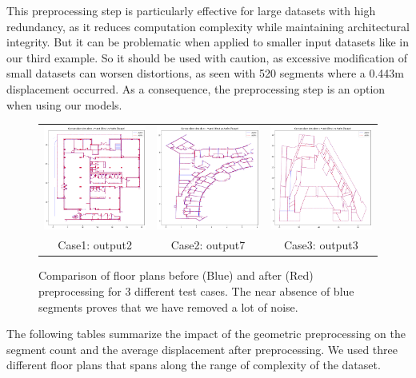 \documentclass[11pt]{article}
\begin{document}
This preprocessing step is particularly effective for large datasets with high 
redundancy, as it reduces computation complexity while maintaining architectural 
integrity. But it can be problematic when applied to smaller input datasets like 
in our third example. So it should be used with caution, as excessive modification 
of small datasets can worsen distortions, as seen with 520 segments where a 0.443m 
displacement occurred. As a consequence, the preprocessing step is an option when
using our models.

\begin{figure}[h]
    \centering
    \begin{tabular}{ccc}
        \includegraphics[width=0.32\linewidth]{figures/avant_apres_pretraitement2.png}
        &
        \includegraphics[width=0.32\linewidth]{figures/avant_apres_pretraitement7.png}
        &
        \includegraphics[width=0.32\linewidth]{figures/avant_apres_pretraitement3.png}
        \\
        Case1: output2 & Case2: output7 & Case3: output3 
    \end{tabular}

    \caption{Comparison of floor plans before (Blue) and after (Red) preprocessing 
    for 3 different test cases. The near absence of blue segments proves that
    we have removed a lot of noise.}
    \label{fig:geojson_comparison}
\end{figure}
The following tables summarize the impact of the geometric preprocessing on the
segment count and the average displacement after preprocessing. We used three 
different floor plans that spans along the range of complexity of the dataset.
\end{document}
